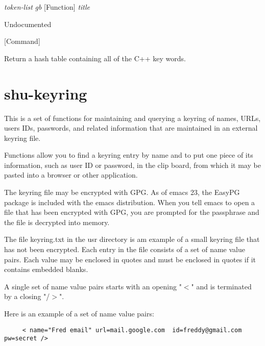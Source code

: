 \vspace{1em}
\noindent
{}
\usebox{\funcname}\emph{token-list} \emph{gb}
 \hfill [Function]
\hspace*{\wd\funcname}\emph{title}

\begin{doc-string}
Undocumented
\end{doc-string}

\vspace{1em}
\noindent
{}
\usebox{\funcname}
 \hfill [Command]

\begin{doc-string}
Return a hash table containing all of the C++ key words.
\end{doc-string}

\eject
\section{shu-keyring}


This is a set of functions for maintaining and querying a keyring of names,
URLs, users IDs, passwords, and related information that are maintained in an
external keyring file.

Functions allow you to find a keyring entry by name and to put one piece of
its information, such as user ID or password, in the clip board, from which it
may be pasted into a browser or other application.

The keyring file may be encrypted with GPG.  As of emacs 23, the EasyPG
package is included with the emacs distribution.  When you tell emacs to open
a file that has been encrypted with GPG, you are prompted for the passphrase
and the file is decrypted into memory.

The file keyring.txt in the usr directory is am example of a small
keyring file that has not been encrypted.  Each entry in the file consists of
a set of name value pairs.  Each value may be enclosed in quotes and must be
enclosed in quotes if it contains embedded blanks.

A single set of name value pairs starts with an opening "$<$" and is terminated
by a closing "/$>$".

Here is an example of a set of name value pairs:

\small{\begin{verbatim}
     < name="Fred email" url=mail.google.com  id=freddy@gmail.com  pw=secret />
\end{verbatim}}


